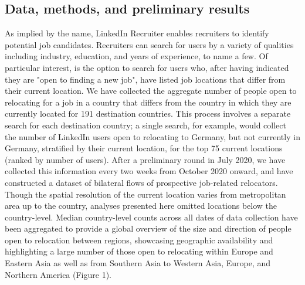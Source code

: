 \subsection*{Data, methods, and preliminary results}
As implied by the name, LinkedIn Recruiter enables recruiters to identify potential job candidates. Recruiters can search for users by a variety of qualities including industry, education, and years of experience, to name a few. Of particular interest, is the option to search for users who, after having indicated they are "open to finding a new job", have listed job locations that differ from their current location. We have collected the aggregate number of people open to relocating for a job in a country that differs from the country in which they are currently located for 191 destination countries. This process involves a separate search for each destination country; a single search, for example, would collect the number of LinkedIn users open to relocating to Germany, but not currently in Germany, stratified by their current location, for the top 75 current locations (ranked by number of users). After a preliminary round in July 2020, we have collected this information every two weeks from October 2020 onward, and have constructed a dataset of bilateral flows of prospective job-related relocators. Though the spatial resolution of the current location varies from metropolitan area up to the country, analyses presented here omitted locations below the country-level. Median country-level counts across all dates of data collection have been aggregated to provide a global overview of the size and direction of people open to relocation between regions, showcasing geographic availability and highlighting a large number of those open to relocating within Europe and Eastern Asia as well as from Southern Asia to Western Asia, Europe, and Northern America (Figure 1).

